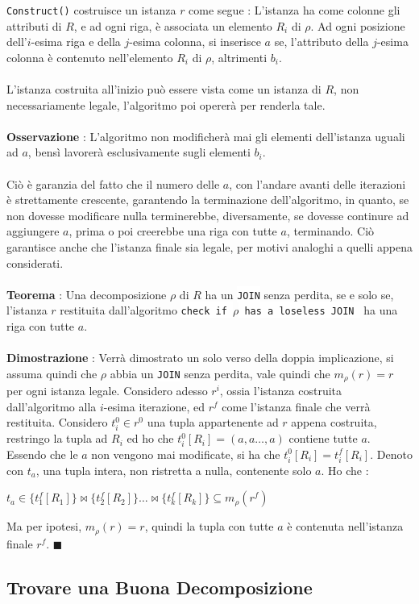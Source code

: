 \documentclass[12pt, letterpaper]{article}
\newcommand{\code}[1]{\colorbox{light-gray}{\texttt{#1}}}
\newcommand{\codee}[1]{\colorbox{white}{\texttt{#1}}}
\newcommand{\acc}{\\\hphantom{}\\}
\begin{document}
\code{Construct()} costruisce un istanza \(r\) come segue : L'istanza ha come colonne gli attributi di \(R\), 
 e ad ogni riga, è associata un elemento \(R_i\) di \(\rho\). Ad ogni posizione dell'\(i\)-esima riga
 e della \(j\)-esima colonna, si inserisce \(a\) se, l'attributo della \(j\)-esima colonna è  
contenuto nell'elemento \(R_i\) di \(\rho\), altrimenti \(b_i\). \acc 
L'istanza costruita all'inizio può essere vista come un istanza di \(R\), non necessariamente legale, l'algoritmo poi opererà 
per renderla tale.\acc 
\textbf{Osservazione} : L'algoritmo non modificherà mai gli elementi dell'istanza uguali ad \(a\), bensì lavorerà esclusivamente 
sugli elementi \(b_i\).\acc 
Ciò è garanzia del fatto che il numero delle \(a\), con l'andare avanti delle iterazioni è strettamente crescente, garantendo la 
terminazione dell'algoritmo, in quanto, se non dovesse modificare nulla terminerebbe, diversamente, se dovesse 
continure ad aggiungere \(a\), prima o poi creerebbe una riga con tutte \(a\), terminando. Ciò  garantisce 
anche che l'istanza finale sia legale, per motivi analoghi a quelli appena considerati.\acc 
\textbf{Teorema} : Una decomposizione \(\rho\) di \(R\) ha un  \codee{JOIN} senza perdita, se e solo se, l'istanza 
\(r\) restituita dall'algoritmo \codee{check if }\(\rho\)\codee{ has a loseless JOIN } ha una riga 
con tutte \(a\).\acc 
\textbf{Dimostrazione} : Verrà dimostrato un solo verso della doppia implicazione, si assuma quindi che 
\(\rho\) abbia un \codee{JOIN} senza perdita, vale quindi che  \(m_\rho(r)=r\) per ogni istanza legale. Considero 
adesso \(r^i\), ossia l'istanza costruita dall'algoritmo alla \(i\)-esima iterazione, ed \(r^f\) come l'istanza 
finale che verrà restituita. Considero \(t_i^0\in r^0\) una tupla appartenente ad \(r\) appena costruita, restringo 
la tupla ad \(R_i\) ed ho che \(t^0_i[R_i]=(a,a\dots,a)\) contiene tutte \(a\). Essendo che le \(a\) non vengono mai 
modificate, si ha che \(t^0_i[R_i]=t^f_i[R_i]\). Denoto con \(t_a\), una tupla intera, non ristretta a nulla, contenente 
solo \(a\). Ho che :\begin{center}
    \(t_a\in\{t_1^f[R_1]\}\Join\{t_2^f[R_2]\}\dots \Join\{t_k^f[R_k]\}\subseteq m_\rho(r^f)\)
\end{center}
Ma per ipotesi, \(m_\rho(r)=r\), quindi la tupla con tutte \(a\) è contenuta nell'istanza finale \(r^f\). \(\blacksquare\)
\subsection{Trovare una Buona Decomposizione}
\end{document}
